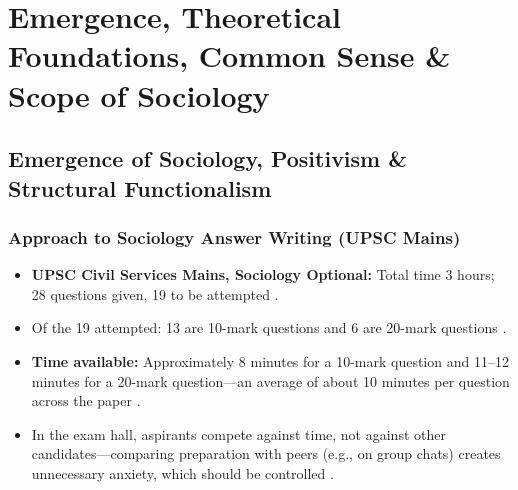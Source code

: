 
\chapter{Emergence, Theoretical Foundations, Common Sense \& Scope of Sociology}

\section{Emergence of Sociology, Positivism \& Structural Functionalism}

\subsection{Approach to Sociology Answer Writing (UPSC Mains)}

\begin{DataFact}
\begin{itemize}
    \item \textbf{UPSC Civil Services Mains, Sociology Optional:} Total time 3 hours; 28 questions given, 19 to be attempted .
    \item Of the 19 attempted: 13 are 10-mark questions and 6 are 20-mark questions .
    \item \textbf{Time available:} Approximately 8 minutes for a 10-mark question and 11--12 minutes for a 20-mark question---an average of about 10 minutes per question across the paper .
    \item In the exam hall, aspirants compete against time, not against other candidates---comparing preparation with peers (e.g., on group chats) creates unnecessary anxiety, which should be controlled .
\end{itemize}
\end{DataFact}


